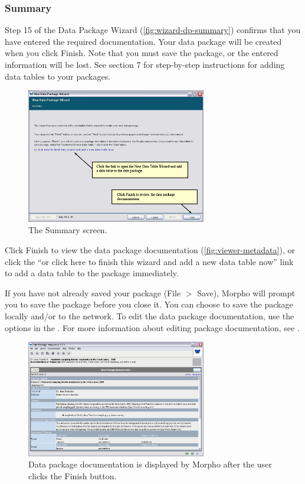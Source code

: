 \subsubsection{Summary} \label{sec:wizard-dp-summary}

Step 15 of the Data Package Wizard (\autoref{fig:wizard-dp-summary})
confirms that you have entered the required documentation. Your data
package will be created when you click Finish. Note that you must save
the package, or the entered information will be lost.  See section 7 for
step-by-step instructions for adding data tables to your packages.

\begin{figure}
  \centering
    \includegraphics[width=0.7\textwidth]{images/wizard-dp-summary.jpg}
  \caption{The Summary screen.}
  \label{fig:wizard-dp-summary}
\end{figure}

Click Finish to view the data package documentation
(\autoref{fig:viewer-metadata}), or click the ``or click here to finish
this wizard and add a new data table now'' link to add a data table to
the package immediately.

If you have not already saved your package (File $>$ Save), Morpho will
prompt you to save the package before you close it. You can choose to
save the package locally and/or to the network. To edit the data package
documentation, use the options in the .
For more information about editing package documentation, see
.

\begin{figure}
  \centering
    \includegraphics[width=0.7\textwidth]{images/viewer-metadata.png}
  \caption{Data package documentation is displayed by Morpho after the
    user clicks the Finish button.}
  \label{fig:viewer-metadata}
\end{figure}

